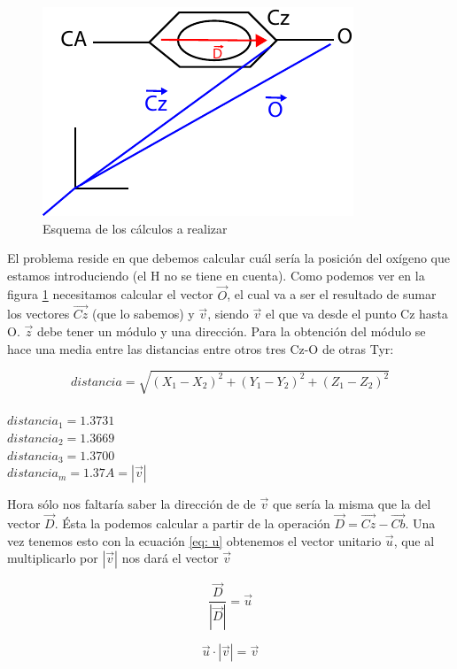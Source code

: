\documentclass[a4paper,11pt]{report}
\begin{document}
\begin{figure}[h!]
	\centering
	\includegraphics{Figuras/Figura29}
	\caption{Esquema de los cálculos a realizar}
	\label{fig: tyr}
\end{figure}

El problema reside en que debemos calcular cuál sería la posición del oxígeno que estamos introduciendo (el H no se tiene en cuenta). Como podemos ver en la figura \ref{fig: tyr} necesitamos calcular el vector $\vec{O}$, el cual va a ser el resultado de sumar los vectores $\vec{Cz}$ (que lo sabemos) y $\vec{v}$, siendo $\vec{v}$ el que va desde el punto Cz hasta O. $\vec{z}$ debe tener un módulo y una dirección. Para la obtención del módulo se hace una media entre las distancias entre otros tres Cz-O de otras Tyr:

\begin{equation}
	distancia = \sqrt{(X_1-X_2)^2 + (Y_1-Y_2)^2 +(Z_1-Z_2)^2}
\end{equation}
\\			
$	distancia_1 = 1.3731$ \\
$	distancia_2 = 1.3669$ 	      	\\
$	distancia_3 = 1.3700$ \\
	
$	distancia_m = 1.37 A =|\vec{v}|$

Hora sólo nos faltaría saber la dirección de de $\vec{v}$ que sería la misma que la del vector $\vec{D}$. Ésta la podemos calcular a partir de la operación $\vec{D}=	\vec{Cz}-\vec{Cb}$. Una vez tenemos esto con la ecuación \ref{eq: u} obtenemos el vector unitario $\vec{u}$, que al multiplicarlo por $|\vec{v}|$ nos dará el vector $\vec{v}$

\begin{equation}
	\frac{\vec{D}}{|\vec{D}|}= \vec{u}
	\label{eq: u}
\end{equation}

\begin{equation}
	\vec{u} \cdot |\vec{v}|= \vec{v}
	\label{eq: v}
\end{equation}
\end{document}
